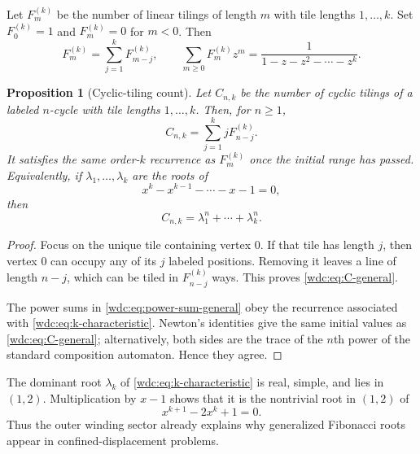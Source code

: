 \documentclass[11pt,letterpaper]{article}
\numberwithin{equation}{section}
\newtheorem{proposition}[theorem]{Proposition}
\theoremstyle{definition}
\begin{document}
Let $F_m^{(k)}$ be the number of linear tilings of length $m$ with tile lengths
$1,\dots,k$.  Set $F_0^{(k)}=1$ and $F_m^{(k)}=0$ for $m<0$.  Then
\begin{equation}\label{wdc:eq:kbonacci-compositions}
  F_m^{(k)}=\sum_{j=1}^k F_{m-j}^{(k)},
  \qquad
  \sum_{m\ge0}F_m^{(k)}z^m=\frac1{1-z-z^2-\cdots-z^k}.
\end{equation}

\begin{proposition}[Cyclic-tiling count]\label{wdc:prop:cyclic-count}
Let $C_{n,k}$ be the number of cyclic tilings of a labeled $n$-cycle with tile
lengths $1,\dots,k$.  Then, for $n\ge1$,
\begin{equation}\label{wdc:eq:C-general}
  C_{n,k}=\sum_{j=1}^k jF_{n-j}^{(k)}.
\end{equation}
It satisfies the same order-$k$ recurrence as $F_m^{(k)}$ once the initial
range has passed.  Equivalently, if $\lambda_1,\dots,\lambda_k$ are the roots
of
\begin{equation}\label{wdc:eq:k-characteristic}
  x^k-x^{k-1}-\cdots-x-1=0,
\end{equation}
then
\begin{equation}\label{wdc:eq:power-sum-general}
  C_{n,k}=\lambda_1^n+\cdots+\lambda_k^n.
\end{equation}
\end{proposition}

\begin{proof}
Focus on the unique tile containing vertex $0$.  If that tile has length $j$,
then vertex $0$ can occupy any of its $j$ labeled positions.  Removing it
leaves a line of length $n-j$, which can be tiled in $F_{n-j}^{(k)}$ ways.
This proves \eqref{wdc:eq:C-general}.

The power sums in \eqref{wdc:eq:power-sum-general} obey the recurrence associated
with \eqref{wdc:eq:k-characteristic}.  Newton's identities give the same initial
values as \eqref{wdc:eq:C-general}; alternatively, both sides are the trace of the
$n$th power of the standard composition automaton.  Hence they agree.
\end{proof}

The dominant root $\lambda_k$ of \eqref{wdc:eq:k-characteristic} is real, simple,
and lies in $(1,2)$.  Multiplication by $x-1$ shows that it is the nontrivial
root in $(1,2)$ of
\begin{equation}\label{wdc:eq:Mendelsohn-root-general}
  x^{k+1}-2x^k+1=0.
\end{equation}
Thus the outer winding sector already explains why generalized Fibonacci roots
appear in confined-displacement problems.
\end{document}
